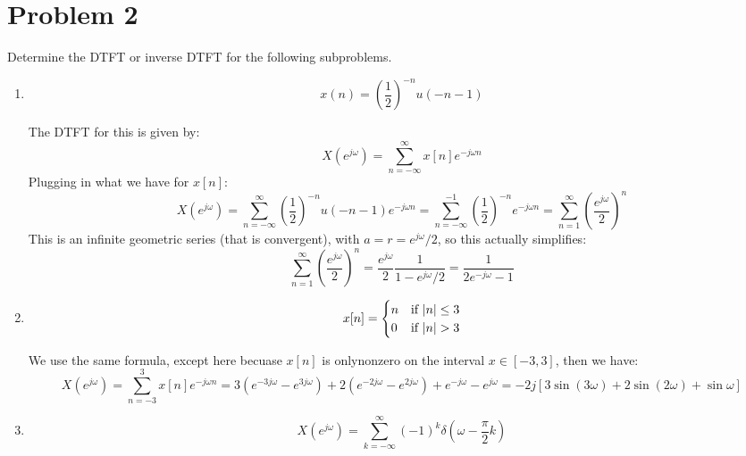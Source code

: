 \documentclass[10pt]{article}
\begin{document}
	\section*{Problem 2}
	Determine the DTFT or inverse DTFT for the following subproblems.
	\begin{enumerate}[label=\alph*)]
		\item 
			\[
			x(n) = \left( \frac{1}{2} \right) ^{-n} u(-n - 1)
			\] 

			\begin{solution}
				The DTFT for this is given by:
				\[
					X(e^{j \omega}) = \sum_{n=-\infty}^{\infty} x[n] e^{- j\omega n}
				\] 
				Plugging in what we have for \( x[n] \):
				\[
				X(e^{j \omega}) = \sum_{n=-\infty}^{\infty} \left( \frac{1}{2} \right) ^{-n}u(-n - 1) e^{- j \omega n}
				= \sum_{n=-\infty}^{-1} \left( \frac{1}{2} \right)^{-n}e^{- j \omega n}
				= \sum_{n=1}^{\infty} \left( \frac{e^{j \omega}}{2} \right)^{n}
				\] 
				This is an infinite geometric series (that is convergent), with \( a = r = e^{j \omega} / 2 \), 
				so this actually simplifies:
				\[
				\sum_{n=1}^{\infty} \left( \frac{e^{j \omega}}{2} \right)^{n} = \frac{e^{j \omega}}{2}\frac{1}{1 - 
				e^{j \omega} / 2} = \frac{1}{2e^{- j \omega} -1}
				\] 
			\end{solution}
		\item 
			\[
				x[n] = \begin{cases}
					n & \text{if \( |n| \le 3 \)}\\
					0 & \text{if \( |n| > 3 \)}
				\end{cases}
			\]

			\begin{solution}
				We use the same formula, except here becuase \( x[n] \) is onlynonzero on the interval 
				\( x \in [-3, 3] \), then we have:
				\[
					X(e^{j \omega}) = \sum_{n=-3}^{3} x[n] e^{- j \omega n}
					= 3(e^{-3 j \omega} - e^{3 j \omega}) + 2(e^{-2 j \omega} - e^{2 j \omega}) + 
					e^{- j \omega} - e^{j \omega} = 
					-2j[3 \sin(3 \omega) + 2 \sin (2 \omega) + \sin \omega]
				\] 
			\end{solution}
		\item 
			\[
			X(e^{j \omega}) = \sum_{k=-\infty}^{\infty} (-1)^{k} \delta\left( \omega - \frac{\pi}{2}k \right) 
			\] 


\end{enumerate}
\end{document}

